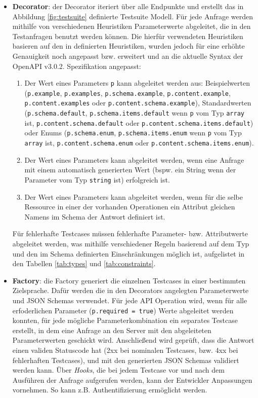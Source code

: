 \begin{itemize}
	\item \textbf{Decorator}: der Decorator iteriert über alle Endpunkte und erstellt das in Abbildung \ref{fig:testsuite} definierte Testsuite Modell. Für jede Anfrage werden mithilfe von verschiedenen Heuristiken Parameterwerte abgeleitet, die in den Testanfragen benutzt werden können. Die hierfür verwendeten Heuristiken basieren auf den in \textcite{ed2018automatic} definierten Heuristiken, wurden jedoch für eine erhöhte Genauigkeit noch angepasst bzw. erweitert und an die aktuelle Syntax der OpenAPI v3.0.2. Spezifikation angepasst: 
	\begin{enumerate}
		\item Der Wert eines Parameters \lstinline|p| kann abgeleitet werden aus: Beispielwerten (\lstinline|p.example|, \lstinline|p.examples|, \lstinline|p.schema.example|, \lstinline|p.content.example|, \lstinline|p.content.examples| oder \lstinline|p.content.schema.example|), Standardwerten (\lstinline|p.schema.default|, \lstinline|p.schema.items.default| wenn \lstinline|p| vom Typ \lstinline|array| ist, \lstinline|p.content.schema.default| oder \lstinline|p.content.schema.items.default|) oder Enums (\lstinline|p.schema.enum|,  \lstinline|p.schema.items.enum| wenn \lstinline|p| vom Typ \lstinline|array| ist, \lstinline|p.content.schema.enum| oder \lstinline|p.content.schema.items.enum|).
		\item Der Wert eines Parameters kann abgeleitet werden, wenn eine Anfrage mit einem automatisch generierten Wert (bspw. ein String wenn der Parameter vom Typ \lstinline|string| ist) erfolgreich ist.
		\item Der Wert eines Parameters kann abgeleitet werden, wenn für die selbe Ressource in einer der vorhanden Operationen ein Attribut gleichen Namens im Schema der Antwort definiert ist.
	\end{enumerate}
	Für fehlerhafte Testcases müssen fehlerhafte Parameter- bzw. Attributwerte abgeleitet werden, was mithilfe verschiedener Regeln basierend auf dem Typ und den im Schema definierten Einschränkungen möglich ist, aufgelistet in den Tabellen \ref{tab:types} und \ref{tab:constraints}. 
	\item \textbf{Factory}: die Factory generiert die einzelnen Testcases in einer bestimmten Zielsprache. Dafür werden die in den Decorators angelegten Parameterwerte und JSON Schemas verwendet. Für jede API Operation wird, wenn für alle erfoderlichen Parameter (\lstinline|p.required = true|) Werte abgeleitet werden konnten,  für jede mögliche Parameterkombination ein separates Testcase erstellt, in dem eine Anfrage an den Server mit den abgeleiteten Parameterwerten geschickt wird. Anschließend wird geprüft, dass die Antwort einen validen Statuscode hat (2xx bei nominalen Testcases, bzw. 4xx bei fehlerhaften Testcases), und mit den generierten JSON Schemas validiert werden kann. Über \emph{Hooks}, die bei jedem Testcase vor und nach dem Ausführen der Anfrage aufgerufen werden, kann der Entwickler Anpassungen vornehmen. So kann z.B. Authentifizierung ermöglicht werden. 
\end{itemize}


